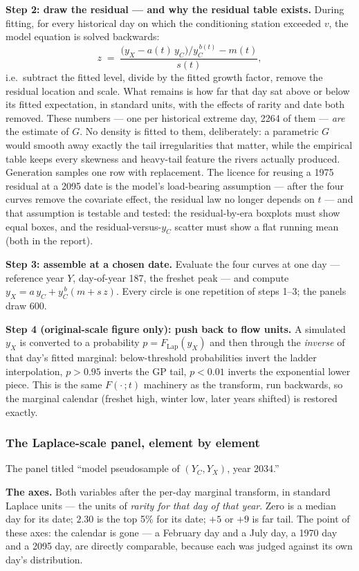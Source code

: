 \documentclass[11pt]{article}
\begin{document}
\textbf{Step 2: draw the residual --- and why the residual table exists.}
During fitting, for every historical day on which the conditioning station
exceeded $v$, the model equation is solved backwards:
\[
z \;=\; \frac{\bigl(y_X - a(t)\,y_C\bigr)/y_C^{\,b(t)} - m(t)}{s(t)} ,
\]
i.e.\ subtract the fitted level, divide by the fitted growth factor, remove
the residual location and scale. What remains is how far that day sat above
or below its fitted expectation, in standard units, with the effects of
rarity and date both removed. These numbers --- one per historical extreme
day, 2264 of them --- \emph{are} the estimate of $G$. No density is fitted to
them, deliberately: a parametric $G$ would smooth away exactly the tail
irregularities that matter, while the empirical table keeps every skewness
and heavy-tail feature the rivers actually produced. Generation samples one
row with replacement. The licence for reusing a 1975 residual at a 2095 date
is the model's load-bearing assumption --- after the four curves remove the
covariate effect, the residual law no longer depends on $t$ --- and that
assumption is testable and tested: the residual-by-era boxplots must show
equal boxes, and the residual-versus-$y_C$ scatter must show a flat running
mean (both in the report).

\textbf{Step 3: assemble at a chosen date.} Evaluate the four curves at one
day --- reference year $Y$, day-of-year 187, the freshet peak --- and compute
$y_X = a\,y_C + y_C^{\,b}(m + s\,z)$. Every circle is one repetition of
steps 1--3; the panels draw 600.

\textbf{Step 4 (original-scale figure only): push back to flow units.} A
simulated $y_X$ is converted to a probability $p = F_{\mathrm{Lap}}(y_X)$ and
then through the \emph{inverse} of that day's fitted marginal:
below-threshold probabilities invert the ladder interpolation, $p > 0.95$
inverts the GP tail, $p < 0.01$ inverts the exponential lower piece. This is
the same $F(\cdot\,;t)$ machinery as the transform, run backwards, so the
marginal calendar (freshet high, winter low, later years shifted) is restored
exactly.

\subsubsection{The Laplace-scale panel, element by element}

The panel titled ``model pseudosample of $(Y_C, Y_X)$, year 2034.''

\textbf{The axes.} Both variables after the per-day marginal transform, in
standard Laplace units --- the units of \emph{rarity for that day of that
year}. Zero is a median day for its date; $2.30$ is the top 5\% for its
date; $+5$ or $+9$ is far tail. The point of these axes: the calendar is
gone --- a February day and a July day, a 1970 day and a 2095 day, are
directly comparable, because each was judged against its own day's
distribution.
\end{document}
